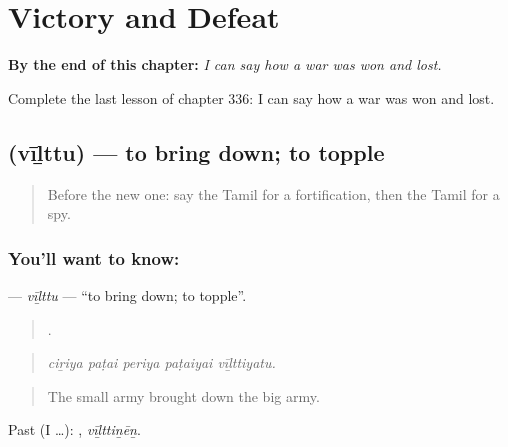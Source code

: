 
\chapter{Victory and Defeat}
\label{ch:ta-victory-and-defeat}

\begin{chapteropening}
\textbf{By the end of this chapter:} \emph{I can say how a war was won and lost.}

Complete the last lesson of chapter 336: I can say how a war was won and lost.
\end{chapteropening}

\section[\texorpdfstring{\ta{வீழ்த்து} (vīḻttu)}{வீழ்த்து (vīḻttu)}]{ (vīḻttu) — to bring down; to topple}

\label{lesson:TA-C336-vilttu}



\begin{quote}
Before the new one: say the Tamil for a fortification, then the Tamil for a spy.
\end{quote}

\subsection*{You'll want to know: }
\textbf{} — \emph{vīḻttu} — \textquotedblleft{}to bring down; to topple\textquotedblright{}.

\begin{quote}
    .
\end{quote}

\begin{quote}
\emph{ciṟiya paṭai periya paṭaiyai vīḻttiyatu.}
\end{quote}

\begin{quote}
The small army brought down the big army.
\end{quote}

Past (I …): , \emph{vīḻttiṉēṉ}.

